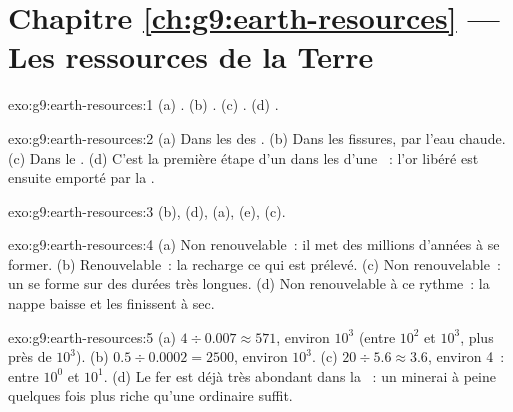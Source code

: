 \section*{Chapitre \ref{ch:g9:earth-resources} --- Les ressources de la Terre}

\begin{solution}{exo:g9:earth-resources:1}
(a) . (b) . (c) . (d) .
\end{solution}

\begin{solution}{exo:g9:earth-resources:2}
(a) Dans les  des . (b) Dans les fissures, par l'eau
chaude. (c) Dans le . (d) C'est la première étape d'un  dans
les  d'une ~: l'or libéré est ensuite emporté par la
.
\end{solution}

\begin{solution}{exo:g9:earth-resources:3}
(b), (d), (a), (e), (c).
\end{solution}

\begin{solution}{exo:g9:earth-resources:4}
(a) Non renouvelable~: il met des millions d'années à se former.
(b) Renouvelable~: la  recharge ce qui est prélevé. (c) Non
renouvelable~: un  se forme sur des durées très longues. (d) Non
renouvelable à ce rythme~: la nappe baisse et les  finissent à sec.
\end{solution}

\begin{solution}{exo:g9:earth-resources:5}
(a) $4 \div 0.007 \approx 571$, environ $10^3$ (entre $10^2$ et $10^3$,
plus près de $10^3$). (b) $0.5 \div 0.0002 = 2500$, environ $10^3$. (c) $20
\div 5.6 \approx 3.6$, environ 4~: entre $10^0$ et $10^1$.
(d) Le fer est déjà très abondant dans la ~: un minerai à peine
quelques fois plus riche qu'une  ordinaire suffit.
\end{solution}

